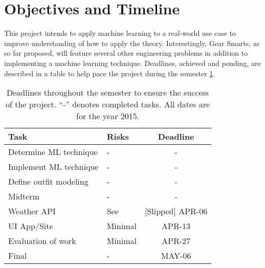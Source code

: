\section{Objectives and Timeline}
\label{section:objectives}
This project intends to apply machine learning to a real-world use case to improve understanding of
how to apply the theory. Interestingly, Gear Smarts, as so far proposed, will feature several other engineering
problems in addition to implementing a machine learning technique. Deadlines, achieved and pending, are described in a
table to help pace the project during the semester \ref{table:objectives}.

\begin{table}
    \begin{tabular}{llc}
        \hline
        \textbf{Task} & \textbf{Risks} & \textbf{Deadline} \\ [0.5ex]
        \hline\hline
        Determine ML technique & - & - \\
        \hline
        Implement ML technique & - & - \\
        \hline
        Define outfit modeling & - & - \\
        \hline
        Midterm & - & - \\
        \hline
        Weather API & See \cite{API:OpenWeatherMap} & [Slipped] APR-06 \\
        \hline
        UI App/Site & Minimal & APR-13 \\
        \hline
        Evaluation of work & Minimal & APR-27 \\
        \hline
        Final & - & MAY-06 \\
        \hline
    \end{tabular}
    \caption{Deadlines throughout the semester to ensure the success of the project. ``-'' denotes completed tasks.
    All dates are for the year 2015.}
    \label{table:objectives}
\end{table}

